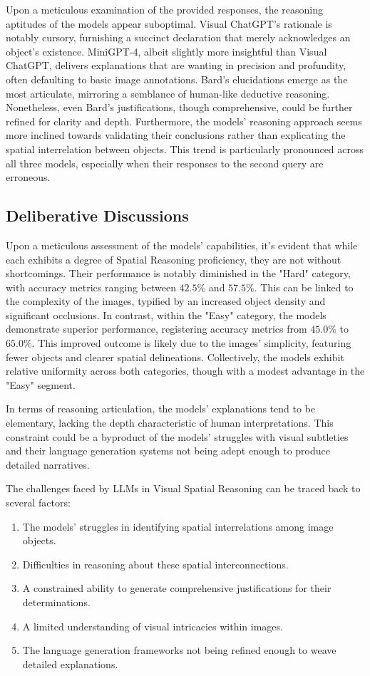 \documentclass[journal,10pt]{IEEEtran}
\begin{document}
Upon a meticulous examination of the provided responses, the reasoning aptitudes of the models appear suboptimal. Visual ChatGPT's rationale is notably cursory, furnishing a succinct declaration that merely acknowledges an object's existence. MiniGPT-4, albeit slightly more insightful than Visual ChatGPT, delivers explanations that are wanting in precision and profundity, often defaulting to basic image annotations. Bard's elucidations emerge as the most articulate, mirroring a semblance of human-like deductive reasoning. Nonetheless, even Bard's justifications, though comprehensive, could be further refined for clarity and depth. Furthermore, the models' reasoning approach seems more inclined towards validating their conclusions rather than explicating the spatial interrelation between objects. This trend is particularly pronounced across all three models, especially when their responses to the second query are erroneous.

\subsection{Deliberative Discussions}

Upon a meticulous assessment of the models' capabilities, it's evident that while each exhibits a degree of Spatial Reasoning proficiency, they are not without shortcomings. Their performance is notably diminished in the "Hard" category, with accuracy metrics ranging between $42.5\%$ and $57.5\%$. This can be linked to the complexity of the images, typified by an increased object density and significant occlusions. In contrast, within the "Easy" category, the models demonstrate superior performance, registering accuracy metrics from $45.0\%$ to $65.0\%$. This improved outcome is likely due to the images' simplicity, featuring fewer objects and clearer spatial delineations. Collectively, the models exhibit relative uniformity across both categories, though with a modest advantage in the "Easy" segment.

In terms of reasoning articulation, the models' explanations tend to be elementary, lacking the depth characteristic of human interpretations. This constraint could be a byproduct of the models' struggles with visual subtleties and their language generation systems not being adept enough to produce detailed narratives.

The challenges faced by LLMs in Visual Spatial Reasoning can be traced back to several factors:
\begin{enumerate}
    \item The models' struggles in identifying spatial interrelations among image objects.
    \item Difficulties in reasoning about these spatial interconnections.
    \item A constrained ability to generate comprehensive justifications for their determinations.
    \item A limited understanding of visual intricacies within images.
    \item The language generation frameworks not being refined enough to weave detailed explanations.
\end{enumerate}
\end{document}
